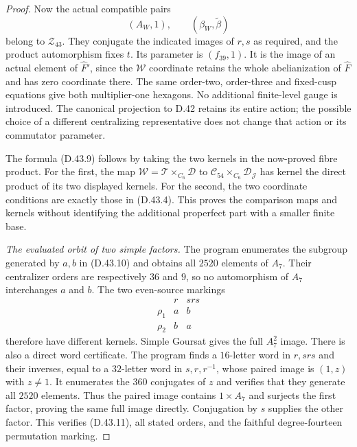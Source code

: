 \begin{proof}
Now the actual
compatible pairs
\[
           (A_W,1),\qquad
           (\beta_W,\widetilde\beta)                  \tag{D.43.23}
\]
belong to
$\mathcal Z_{43}$.
They conjugate
the indicated
images of $r,s$
as required,
and the product
automorphism
fixes $t$.
Its parameter
is
$(f_{39},1)$.
It is the image
of an actual
element of
$\widehat F'$,
since the
$\mathcal W$
coordinate
retains the
whole abelianization
of $\widehat F$
and has zero
coordinate there.
The same
order-two,
order-three
and fixed-cusp
equations give
both multiplier-one
hexagons.
No additional
finite-level
gauge is introduced.
The canonical
projection to
D.42 retains its
entire action;
the possible
choice of a
different centralizing
representative
does not change
that action or
its commutator
parameter.

The formula
(D.43.9) follows
by taking the
two kernels in
the now-proved
fibre product.
For the first,
the map
$\mathcal W=
\mathcal T\times_{C_6}\mathcal D$
to
$\mathcal C_{54}\times_{C_6}
\mathcal D_{\mathscr J}$
has kernel the
direct product
of its two
displayed kernels.
For the second,
the two coordinate
conditions are
exactly those in
(D.43.4). This
proves the
comparison maps
and kernels
without identifying
the additional
properfect part
with a smaller
finite base.

\emph{The evaluated orbit of two simple factors.}
The program enumerates
the subgroup generated
by $a,b$ in (D.43.10)
and obtains all
$2520$ elements
of $A_7$.
Their centralizer
orders are respectively
$36$ and $9$,
so no automorphism
of $A_7$ interchanges
$a$ and $b$.
The two even-source
markings
\[
 \begin{array}{c|cc}
       &r&srs\\ \hline
  \rho_1&a&b\\
  \rho_2&b&a
 \end{array}                                                   \tag{D.43.24}
\]
therefore have
different kernels.
Simple Goursat
gives the full
$A_7^2$ image.
There is also
a direct word
certificate.
The program finds
a $16$-letter
word in
$r,srs$ and
their inverses,
equal to a
$32$-letter word
in $s,r,r^{-1}$,
whose paired
image is
$(1,z)$ with
$z\ne1$.
It enumerates
the $360$
conjugates of
$z$ and verifies
that they generate
all $2520$
elements.
Thus the paired
image contains
$1\times A_7$
and surjects
the first
factor, proving
the same full
image directly.
Conjugation by
$s$ supplies
the other factor.
This verifies
(D.43.11),
all stated orders,
and the faithful
degree-fourteen
permutation
marking.


\end{proof}
